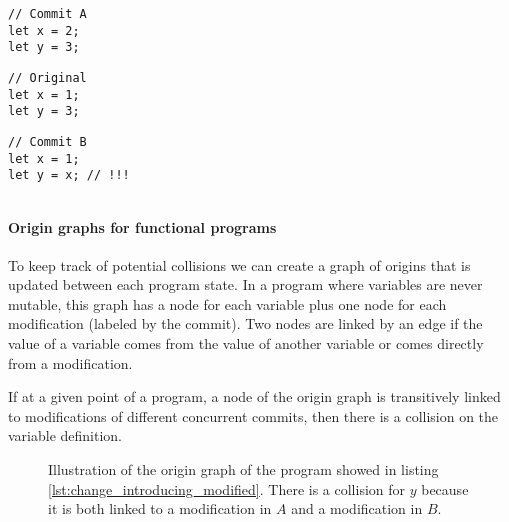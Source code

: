 \documentclass[a4paper,10pt]{article}
\begin{document}
\noindent
\begin{minipage}{.32\textwidth}
\begin{lstlisting}
// Commit A
let x = 2;
let y = 3;
\end{lstlisting}
\end{minipage}\hfill
\begin{minipage}{.32\textwidth}
\begin{lstlisting}
// Original
let x = 1;
let y = 3;
\end{lstlisting}
\end{minipage}\hfill
\begin{minipage}{.32\textwidth}
\begin{lstlisting}
// Commit B
let x = 1;
let y = x; // !!!
\end{lstlisting}
\end{minipage}
\vspace{-.4cm}
\begin{lstlisting}[label=lst:change_introducing_modified, caption={Colliding changes by using a variable modified by someone else}]
\end{lstlisting}

\paragraph{Origin graphs for functional programs} To keep track of potential collisions we can create a graph of origins that is updated between each program state. In a program where variables are never mutable, this graph has a node for each variable plus one node for each modification (labeled by the commit). Two nodes are linked by an edge if the value of a variable comes from the value of another variable or comes directly from a modification.

If at a given point of a program, a node of the origin graph is transitively linked to modifications of different concurrent commits, then there is a collision on the variable definition.

\begin{figure}[ht]
\centering{}
\caption{Illustration of the origin graph of the program showed in listing \ref{lst:change_introducing_modified}. There is a collision for $y$ because it is both linked to a modification in $A$ and a modification in $B$.}
\label{fig:change_introducing_modified}
\end{figure}
\end{document}
